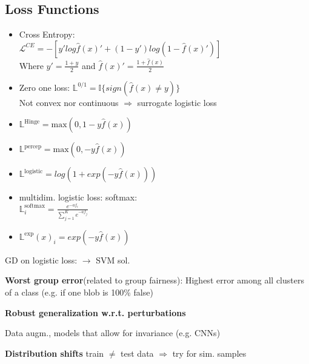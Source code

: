 \subsection{Loss Functions}

\begin{itemize}
    \item Cross Entropy: \\$\mathcal{L}^{CE} = -\left[y'log\hat{f}(x)' + (1-y')log(1-\hat{f}(x)')\right]$\\
    Where $y' = \frac{1+y}{2}$ and $\hat{f}(x)' = \frac{1+\hat{f}(x)}{2}$
    \item Zero one loss: $\mathbb{L}^{0/1} = \mathbb{I}\{sign(\hat{f}(x) \neq y)\}$\\
    Not convex nor continuous $\Rightarrow$ surrogate logistic loss 
    \item $\mathbb{L}^{\text{Hinge}} = \text{max}(0,1-y\hat{f}(x))$
    \item $\mathbb{L}^{\text{percep}} = \text{max}(0, - y\hat{f}(x))$
    \item $\mathbb{L}^{\text{logistic}} = log(1 + exp(-y\hat{f}(x)))$
    \item multidim. logistic loss: softmax: \\
    $\mathbb{L}^{\text{softmax}}_i = \frac{e^{-af_i}}{\sum_{j=1}^{K}e^{-af_j}}$
    \item $\mathbb{L}^{\text{exp}}(x)_i = exp(-y\hat{f}(x))$
\end{itemize}
GD on logistic loss: $\rightarrow$ SVM sol.

\textbf{Worst group error}(related to group fairness): Highest error among all clusters of a class (e.g. if one blob is 100\% false)

\textbf{Robust generalization w.r.t. perturbations}

Data augm., models that allow for invariance (e.g. CNNs)

\textbf{Distribution shifts} train $\neq$ test data $\Rightarrow$ try for sim. samples



